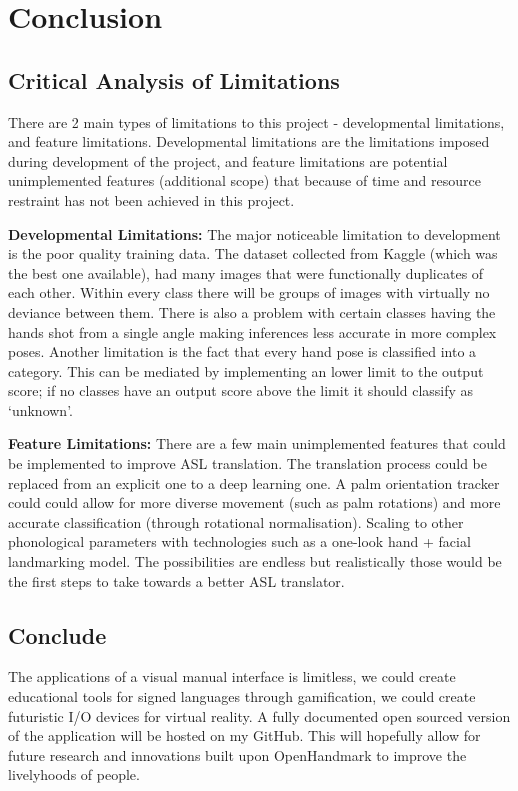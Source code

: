 \documentclass[11pt]{article}
\def\paraskip{\vskip 0.4cm}
\begin{document}
\section{Conclusion}
    \subsection{Critical Analysis of Limitations}
    There are 2 main types of limitations to this project - developmental limitations, and feature limitations. Developmental limitations are the limitations imposed during development of the project, and feature limitations are potential unimplemented features (additional scope) that because of time and resource restraint has not been achieved in this project.

    \paraskip

    \noindent\textbf{Developmental Limitations: } The major noticeable limitation to development is the poor quality training data. The dataset collected from Kaggle (which was the best one available), had many images that were functionally duplicates of each other. Within every class there will be groups of images with virtually no deviance between them. There is also a problem with certain classes having the hands shot from a single angle making inferences less accurate in more complex poses. Another limitation is the fact that every hand pose is classified into a category. This can be mediated by implementing an lower limit to the output score; if no classes have an output score above the limit it should classify as `unknown'.

    \paraskip

    \noindent\textbf{Feature Limitations: } There are a few main unimplemented features that could be implemented to improve ASL translation. The translation process could be replaced from an explicit one to a deep learning one. A palm orientation tracker could could allow for more diverse movement (such as palm rotations) and more accurate classification (through rotational normalisation). Scaling to other phonological parameters with technologies such as a one-look hand + facial landmarking model. The possibilities are endless but realistically those would be the first steps to take towards a better ASL translator.

    \subsection{Conclude}
    The applications of a visual manual interface is limitless, we could create educational tools for signed languages through gamification, we could create futuristic I/O devices for virtual reality. A fully documented open sourced version of the application will be hosted on my GitHub. This will hopefully allow for future research and innovations built upon OpenHandmark to improve the livelyhoods of people.
\end{document}
